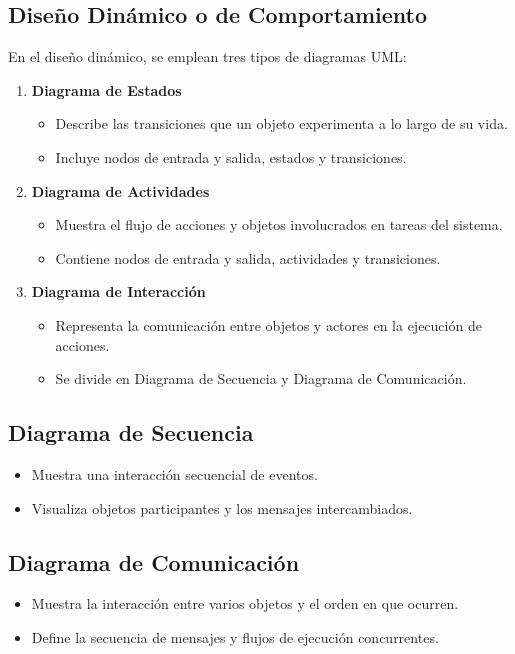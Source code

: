 \documentclass[11pt, twocolumn]{article}
\begin{document}
  \subsection*{Diseño Dinámico o de Comportamiento}
  En el diseño dinámico, se emplean tres tipos de diagramas UML:
  \begin{enumerate}
    \item \textbf{Diagrama de Estados}
    \begin{itemize}
      \item Describe las transiciones que un objeto experimenta a lo largo de su vida.
      \item Incluye nodos de entrada y salida, estados y transiciones.
    \end{itemize}

    \item \textbf{Diagrama de Actividades}
    \begin{itemize}
      \item Muestra el flujo de acciones y objetos involucrados en tareas del sistema.
      \item Contiene nodos de entrada y salida, actividades y transiciones.
    \end{itemize}

    \item \textbf{Diagrama de Interacción}
    \begin{itemize}
      \item Representa la comunicación entre objetos y actores en la ejecución de acciones.
      \item Se divide en Diagrama de Secuencia y Diagrama de Comunicación.
    \end{itemize}
  \end{enumerate}

  \subsection*{Diagrama de Secuencia}
  \begin{itemize}
    \item Muestra una interacción secuencial de eventos.
    \item Visualiza objetos participantes y los mensajes intercambiados.
  \end{itemize}

  \subsection*{Diagrama de Comunicación}
  \begin{itemize}
    \item Muestra la interacción entre varios objetos y el orden en que ocurren.
    \item Define la secuencia de mensajes y flujos de ejecución concurrentes.
  \end{itemize}
\end{document}
